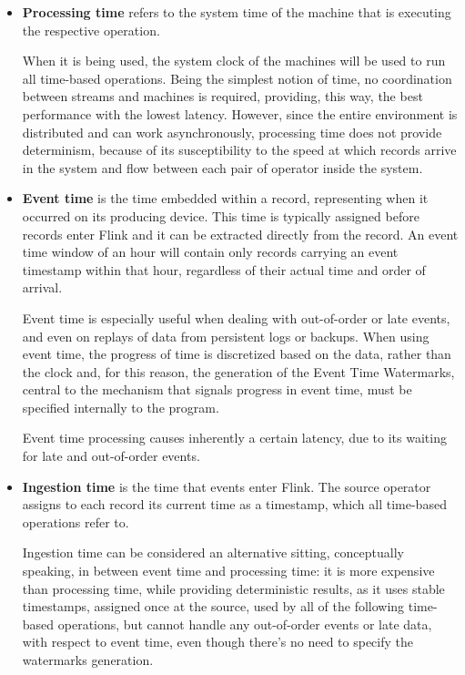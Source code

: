 \begin{itemize}
    \item \textbf{Processing time} refers to the system time of the machine that is executing the respective operation.
    
    When it is being used, the system clock of the machines will be used to run all time-based operations. Being the simplest notion of time, no coordination between streams and machines is required, providing, this way, the best performance with the lowest latency. However, since the entire environment is distributed and can work asynchronously, processing time does not provide determinism, because of its susceptibility to the speed at which records arrive in the system and flow between each pair of operator inside the system.
    
    \item \textbf{Event time} is the time embedded within a record, representing when it occurred on its producing device. This time is typically assigned before records enter Flink and it can be extracted directly from the record. An event time window of an hour will contain only records carrying an event timestamp within that hour, regardless of their actual time and order of arrival.
    
    Event time is especially useful when dealing with out-of-order or late events, and even on replays of data from persistent logs or backups. When using event time, the progress of time is discretized based on the data, rather than the clock and, for this reason, the generation of the Event Time Watermarks, central to the mechanism that signals progress in event time,  must be specified internally to the program.
    
    Event time processing causes inherently a certain latency, due to its waiting for late and out-of-order events.
    
    \item \textbf{Ingestion time} is the time that events enter Flink. The source operator assigns to each record its current time as a timestamp, which all time-based operations refer to.
    
    Ingestion time can be considered an alternative sitting, conceptually speaking, in between event time and processing time: it is more expensive than processing time, while providing deterministic results, as it uses stable timestamps, assigned once at the source, used by all of the following time-based operations, but cannot handle any out-of-order events or late data, with respect to event time, even though there's no need to specify the watermarks generation.
\end{itemize}


